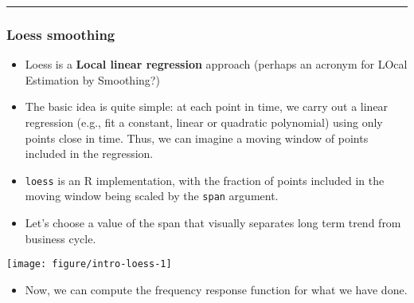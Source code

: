 \documentclass[]{article}
\newenvironment{Shaded}{\begin{snugshade}}{\end{snugshade}}
\newcommand{\KeywordTok}[1]{\textcolor[rgb]{0.13,0.29,0.53}{\textbf{#1}}}
\newcommand{\DataTypeTok}[1]{\textcolor[rgb]{0.13,0.29,0.53}{#1}}
\newcommand{\FloatTok}[1]{\textcolor[rgb]{0.00,0.00,0.81}{#1}}
\newcommand{\StringTok}[1]{\textcolor[rgb]{0.31,0.60,0.02}{#1}}
\newcommand{\OperatorTok}[1]{\textcolor[rgb]{0.81,0.36,0.00}{\textbf{#1}}}
\newcommand{\NormalTok}[1]{#1}
\providecommand{\tightlist}{%
  \setlength{\itemsep}{0pt}\setlength{\parskip}{0pt}}
\begin{document}
\begin{center}\rule{0.5\linewidth}{\linethickness}\end{center}

\subsubsection{Loess smoothing}\label{loess-smoothing}

\begin{itemize}
\item
  Loess is a \textbf{Local linear regression} approach (perhaps an
  acronym for LOcal Estimation by Smoothing?)
\item
  The basic idea is quite simple: at each point in time, we carry out a
  linear regression (e.g., fit a constant, linear or quadratic
  polynomial) using only points close in time. Thus, we can imagine a
  moving window of points included in the regression.
\item
  \texttt{loess} is an R implementation, with the fraction of points
  included in the moving window being scaled by the \texttt{span}
  argument.
\item
  Let's choose a value of the span that visually separates long term
  trend from business cycle.
\end{itemize}

\begin{Shaded}
\end{Shaded}

\begin{center}\texttt{[image: figure/intro-loess-1]} \end{center}

\begin{itemize}
\tightlist
\item
  Now, we can compute the frequency response function for what we have
  done.
\end{itemize}
\end{document}
